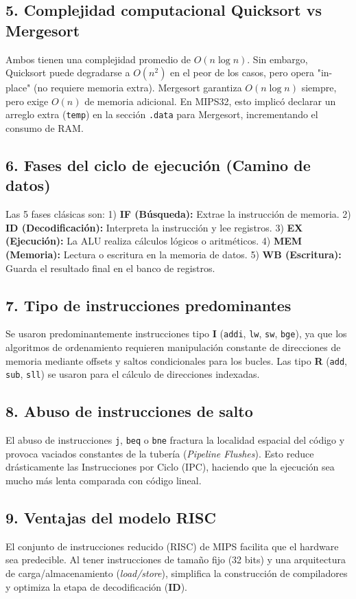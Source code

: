 \documentclass[12pt, a4paper]{article}
\begin{document}
\subsection{5. Complejidad computacional Quicksort vs Mergesort}
Ambos tienen una complejidad promedio de $O(n \log n)$. Sin embargo, Quicksort puede degradarse a $O(n^2)$ en el peor de los casos, pero opera "in-place" (no requiere memoria extra). Mergesort garantiza $O(n \log n)$ siempre, pero exige $O(n)$ de memoria adicional. En MIPS32, esto implicó declarar un arreglo extra (\texttt{temp}) en la sección \texttt{.data} para Mergesort, incrementando el consumo de RAM.

\subsection{6. Fases del ciclo de ejecución (Camino de datos)}
Las 5 fases clásicas son: 
1) \textbf{IF (Búsqueda):} Extrae la instrucción de memoria.
2) \textbf{ID (Decodificación):} Interpreta la instrucción y lee registros.
3) \textbf{EX (Ejecución):} La ALU realiza cálculos lógicos o aritméticos.
4) \textbf{MEM (Memoria):} Lectura o escritura en la memoria de datos.
5) \textbf{WB (Escritura):} Guarda el resultado final en el banco de registros.

\subsection{7. Tipo de instrucciones predominantes}
Se usaron predominantemente instrucciones tipo \textbf{I} (\texttt{addi}, \texttt{lw}, \texttt{sw}, \texttt{bge}), ya que los algoritmos de ordenamiento requieren manipulación constante de direcciones de memoria mediante offsets y saltos condicionales para los bucles. Las tipo \textbf{R} (\texttt{add}, \texttt{sub}, \texttt{sll}) se usaron para el cálculo de direcciones indexadas.

\subsection{8. Abuso de instrucciones de salto}
El abuso de instrucciones \texttt{j}, \texttt{beq} o \texttt{bne} fractura la localidad espacial del código y provoca vaciados constantes de la tubería (\textit{Pipeline Flushes}). Esto reduce drásticamente las Instrucciones por Ciclo (IPC), haciendo que la ejecución sea mucho más lenta comparada con código lineal.

\subsection{9. Ventajas del modelo RISC}
El conjunto de instrucciones reducido (RISC) de MIPS facilita que el hardware sea predecible. Al tener instrucciones de tamaño fijo (32 bits) y una arquitectura de carga/almacenamiento (\textit{load/store}), simplifica la construcción de compiladores y optimiza la etapa de decodificación (\textbf{ID}).
\end{document}
